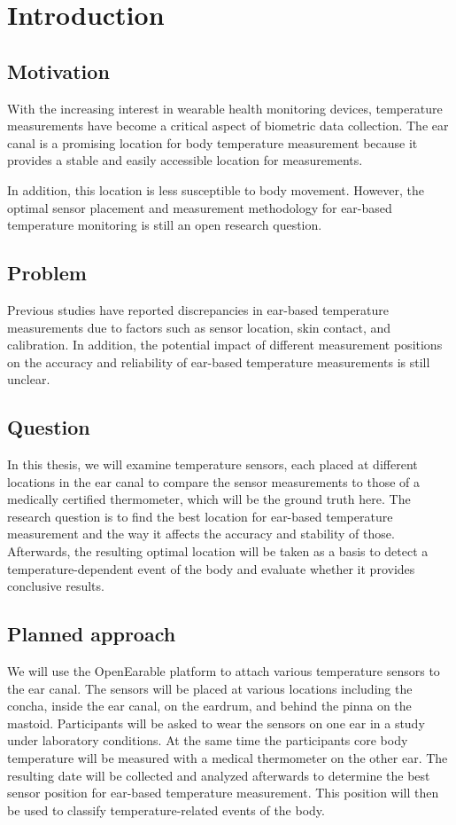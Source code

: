 
\chapter{Introduction}
\label{ch:Introduction}

\section{Motivation}
With the increasing interest in wearable health monitoring devices, temperature measurements have become a critical aspect of biometric data collection. The ear canal is a promising location for body temperature measurement because it provides a stable and easily accessible location for measurements.

In addition, this location is less susceptible to body movement. However, the optimal sensor placement and measurement methodology for ear-based temperature monitoring is still an open research question.

\section{Problem}
Previous studies have reported discrepancies in ear-based temperature measurements due to factors such as sensor location, skin contact, and calibration. In addition, the potential impact of different measurement positions on the accuracy and reliability of ear-based temperature measurements is still unclear.

\section{Question}
In this thesis, we will examine temperature sensors, each placed at different locations in the ear canal to compare the sensor measurements to those of a medically certified thermometer, which will be the ground truth here. The research question is to find the best location for ear-based temperature measurement and the way it affects the accuracy and stability of those. Afterwards, the resulting optimal location will be taken as a basis to detect a temperature-dependent event of the body and evaluate whether it provides conclusive results.

\section{Planned approach}
We will use the OpenEarable platform to attach various temperature sensors to the ear canal. The sensors will be placed at various locations including the concha, inside the ear canal, on the eardrum, and behind the pinna on the mastoid. Participants will be asked to wear the sensors on one ear in a study under laboratory conditions. At the same time the participants core body temperature will be measured with a medical thermometer on the other ear. The resulting date will be collected and analyzed afterwards to determine the best sensor position for ear-based temperature measurement. This position will then be used to classify temperature-related events of the body.

